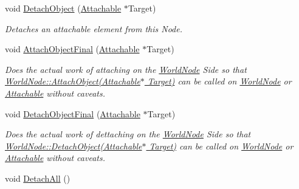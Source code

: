 \begin{DoxyCompactItemize}
void \hyperlink{classphys_1_1WorldNode_a15da2580dfbe1c684819d8783b3359ae}{DetachObject} (\hyperlink{classphys_1_1Attachable}{Attachable} $\ast$Target)
\begin{DoxyCompactList}\small\item\em Detaches an attachable element from this Node. \item\end{DoxyCompactList}\item 
void \hyperlink{classphys_1_1WorldNode_a6e4aa8bc4b916cfff06d03814a7dd80f}{AttachObjectFinal} (\hyperlink{classphys_1_1Attachable}{Attachable} $\ast$Target)
\begin{DoxyCompactList}\small\item\em Does the actual work of attaching on the \hyperlink{classphys_1_1WorldNode}{WorldNode} Side so that \hyperlink{classphys_1_1WorldNode_a25b5a05bb87967fe21f153ce4418b43e}{WorldNode::AttachObject(Attachable$\ast$ Target)} can be called on \hyperlink{classphys_1_1WorldNode}{WorldNode} or \hyperlink{classphys_1_1Attachable}{Attachable} without caveats. \item\end{DoxyCompactList}\item 
void \hyperlink{classphys_1_1WorldNode_ae300db6515b782b165e77d19b7137851}{DetachObjectFinal} (\hyperlink{classphys_1_1Attachable}{Attachable} $\ast$Target)
\begin{DoxyCompactList}\small\item\em Does the actual work of dettaching on the \hyperlink{classphys_1_1WorldNode}{WorldNode} Side so that \hyperlink{classphys_1_1WorldNode_a15da2580dfbe1c684819d8783b3359ae}{WorldNode::DetachObject(Attachable$\ast$ Target)} can be called on \hyperlink{classphys_1_1WorldNode}{WorldNode} or \hyperlink{classphys_1_1Attachable}{Attachable} without caveats. \item\end{DoxyCompactList}\item 
\hypertarget{classphys_1_1WorldNode_ab13dcee1719c95f8328eba2e2d7a94da}{
void \hyperlink{classphys_1_1WorldNode_ab13dcee1719c95f8328eba2e2d7a94da}{DetachAll} ()}
\label{d2/d3e/classphys_1_1WorldNode_ab13dcee1719c95f8328eba2e2d7a94da}


\end{DoxyCompactItemize}
